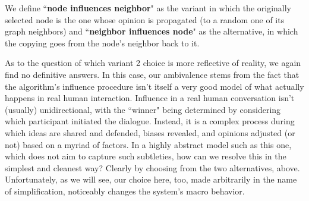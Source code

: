 We define ``\textbf{node influences neighbor}" as the variant in which the
originally selected node is the one whose opinion is propagated (to a random
one of its graph neighbors) and ``\textbf{neighbor influences node}" as the
alternative, in which the copying goes from the node's neighbor back to it.

As to the question of which variant 2 choice is more reflective of reality, we
again find no definitive answers. In this case, our ambivalence stems from the
fact that the algorithm's influence procedure isn't itself a very good model
of what actually happens in real human interaction. Influence in a real human
conversation isn't (usually) unidirectional, with the ``winner" being
determined by considering which participant initiated the dialogue. Instead,
it is a complex process during which ideas are shared and defended, biases
revealed, and opinions adjusted (or not) based on a myriad of factors. In a
highly abstract model such as this one, which does not aim to capture such
subtleties, how can we resolve this in the simplest and cleanest way? Clearly
by choosing from the two alternatives, above. Unfortunately, as we will see,
our choice here, too, made arbitrarily in the name of simplification,
noticeably changes the system's macro behavior.

